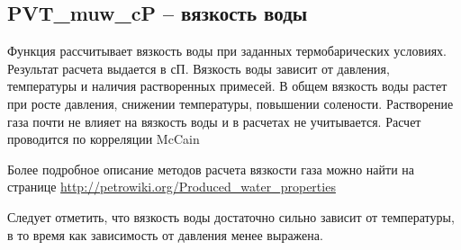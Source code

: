 \newcommand{\MugDataFile}{data/Mug_P_data.txt}

\subsection{PVT\_muw\_cP – вязкость воды}

Функция рассчитывает вязкость воды при заданных термобарических условиях. Результат расчета выдается в сП. 
Вязкость воды зависит от давления, температуры и наличия растворенных примесей. В общем вязкость воды растет при росте давления, снижении температуры, повышении солености. 
Растворение газа почти не влияет на вязкость воды и в расчетах не учитывается. 
Расчет проводится по корреляции McCain \cite{McCain_1991}

Более подробное описание методов расчета вязкости газа можно найти на странице  \href{http://petrowiki.org/Produced_water_properties}{http://petrowiki.org/Produced\_water\_properties}




Следует отметить, что вязкость воды достаточно сильно зависит от температуры, в то время как зависимость от давления менее выражена.

